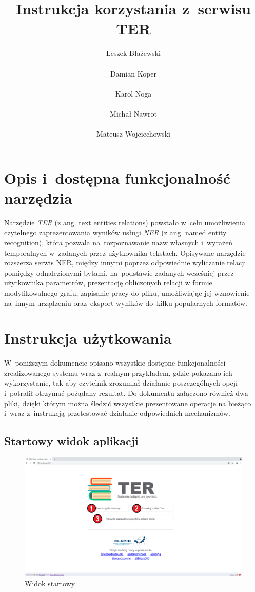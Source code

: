 \documentclass[12pt, a4paper]{article}
\title{ Instrukcja korzystania z~serwisu TER}
\author{ Leszek Błażewski\\\\Damian Koper\\\\Karol Noga\\\\Michał Nawrot\\\\Mateusz Wojciechowski}
\begin{document}
\maketitle
\pagebreak

\tableofcontents
\pagebreak


\section{Opis i~dostępna funkcjonalność narzędzia}

Narzędzie \textit{TER} (z ang. text entities relations) powstało w~celu umożliwienia czytelnego zaprezentowania wyników usługi \textit{NER} (z ang. named entity recognition), która pozwala na~rozpoznawanie nazw własnych i~wyrażeń temporalnych w~zadanych przez użytkownika tekstach. Opisywane narzędzie rozszerza serwis NER, między innymi poprzez odpowiednie wyliczanie relacji pomiędzy odnalezionymi bytami, na~podstawie zadanych wcześniej przez użytkownika parametrów, prezentację obliczonych relacji w formie modyfikowalnego grafu, zapisanie pracy do pliku, umożliwiając jej wznowienie na~innym urządzeniu oraz~eksport wyników do~kilku popularnych formatów.

\section{Instrukcja użytkowania}

W~poniższym dokumencie opisano wszystkie dostępne funkcjonalności zrealizowanego systemu wraz z~realnym przykładem, gdzie pokazano ich wykorzystanie, tak aby czytelnik zrozumiał działanie poszczególnych opcji i~potrafił otrzymać pożądany rezultat. Do dokumentu załączono również dwa pliki, dzięki którym można śledzić wszystkie prezentowane operacje na bieżąco i~wraz z~instrukcją przetestować działanie odpowiednich mechanizmów.

\pagebreak

\subsection{Startowy widok aplikacji}

\begin{figure}[H]
  \centering
  \includegraphics[width=\linewidth]{images/homepage.png}
  \caption{Widok startowy}
  \label{main-view}
\end{figure}
\end{document}
